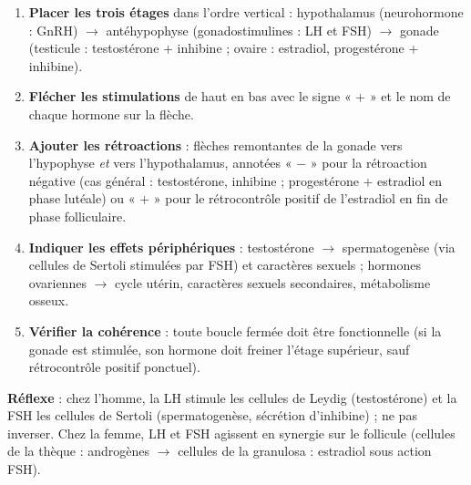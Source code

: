 \documentclass[11pt]{article}
\begin{document}
\begin{methode}
\begin{enumerate}
\item \textbf{Placer les trois étages} dans l'ordre vertical : hypothalamus (neurohormone : GnRH) $\rightarrow$ antéhypophyse (gonadostimulines : LH et FSH) $\rightarrow$ gonade (testicule : testostérone + inhibine ; ovaire : estradiol, progestérone + inhibine).
\item \textbf{Flécher les stimulations} de haut en bas avec le signe « + » et le nom de chaque hormone sur la flèche.
\item \textbf{Ajouter les rétroactions} : flèches remontantes de la gonade vers l'hypophyse \emph{et} vers l'hypothalamus, annotées « $-$ » pour la rétroaction négative (cas général : testostérone, inhibine ; progestérone + estradiol en phase lutéale) ou « + » pour le rétrocontrôle positif de l'estradiol en fin de phase folliculaire.
\item \textbf{Indiquer les effets périphériques} : testostérone $\rightarrow$ spermatogenèse (via cellules de Sertoli stimulées par FSH) et caractères sexuels ; hormones ovariennes $\rightarrow$ cycle utérin, caractères sexuels secondaires, métabolisme osseux.
\item \textbf{Vérifier la cohérence} : toute boucle fermée doit être fonctionnelle (si la gonade est stimulée, son hormone doit freiner l'étage supérieur, sauf rétrocontrôle positif ponctuel).
\end{enumerate}
\textbf{Réflexe} : chez l'homme, la LH stimule les cellules de Leydig (testostérone) et la FSH les cellules de Sertoli (spermatogenèse, sécrétion d'inhibine) ; ne pas inverser. Chez la femme, LH et FSH agissent en synergie sur le follicule (cellules de la thèque : androgènes $\rightarrow$ cellules de la granulosa : estradiol sous action FSH).
\end{methode}
\end{document}
